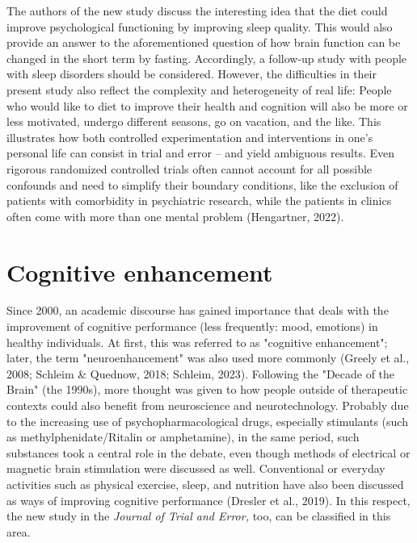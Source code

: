\documentclass[authordate, reflection,issue]{jote-new-article}
\begin{document}
The authors of the new study discuss the interesting idea that the diet could improve psychological functioning by improving sleep quality. This would also provide an answer to the aforementioned question of how brain function can be changed in the short term by fasting. Accordingly, a follow-up study with people with sleep disorders should be considered. However, the difficulties in their present study also reflect the complexity and heterogeneity of real life: People who would like to diet to improve their health and cognition will also be more or less motivated, undergo different seasons, go on vacation, and the like. This illustrates how both controlled experimentation and interventions in one's personal life can consist in trial and error -- and yield ambiguous results. Even rigorous randomized controlled trials often cannot account for all possible confounds and need to simplify their boundary conditions, like the exclusion of patients with comorbidity in psychiatric research, while the patients in clinics often come with more than one mental problem (Hengartner, 2022).







\section{\textbf{Cognitive enhancement}}







Since 2000, an academic discourse has gained importance that deals with the improvement of cognitive performance (less frequently: mood, emotions) in healthy individuals. At first, this was referred to as "cognitive enhancement"; later, the term "neuroenhancement" was also used more commonly (Greely et al., 2008; Schleim \& Quednow, 2018; Schleim, 2023). Following the "Decade of the Brain" (the 1990s), more thought was given to how people outside of therapeutic contexts could also benefit from neuroscience and neurotechnology. Probably due to the increasing use of psychopharmacological drugs, especially stimulants (such as methylphenidate/Ritalin or amphetamine), in the same period, such substances took a central role in the debate, even though methods of electrical or magnetic brain stimulation were discussed as well. Conventional or everyday activities such as physical exercise, sleep, and nutrition have also been discussed as ways of improving cognitive performance (Dresler et al., 2019). In this respect, the new study in the \emph{Journal of Trial and Error, }too, can be classified in this area.
\end{document}
